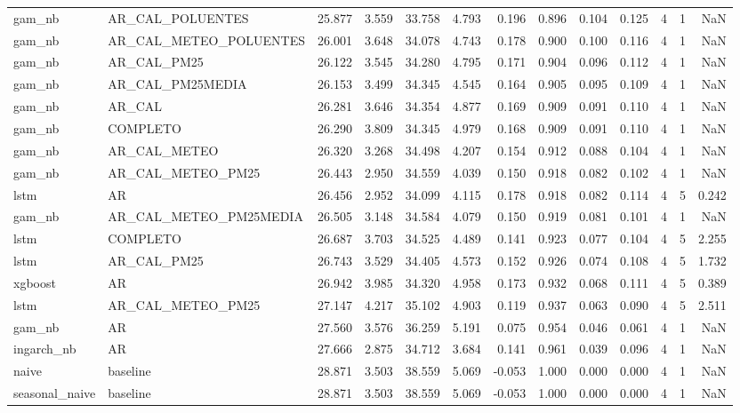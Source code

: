 \begin{tabular}{llrrrrrrrrrrr}
gam_nb & AR_CAL_POLUENTES & 25.877 & 3.559 & 33.758 & 4.793 & 0.196 & 0.896 & 0.104 & 0.125 & 4 & 1 & NaN \\
gam_nb & AR_CAL_METEO_POLUENTES & 26.001 & 3.648 & 34.078 & 4.743 & 0.178 & 0.900 & 0.100 & 0.116 & 4 & 1 & NaN \\
gam_nb & AR_CAL_PM25 & 26.122 & 3.545 & 34.280 & 4.795 & 0.171 & 0.904 & 0.096 & 0.112 & 4 & 1 & NaN \\
gam_nb & AR_CAL_PM25MEDIA & 26.153 & 3.499 & 34.345 & 4.545 & 0.164 & 0.905 & 0.095 & 0.109 & 4 & 1 & NaN \\
gam_nb & AR_CAL & 26.281 & 3.646 & 34.354 & 4.877 & 0.169 & 0.909 & 0.091 & 0.110 & 4 & 1 & NaN \\
gam_nb & COMPLETO & 26.290 & 3.809 & 34.345 & 4.979 & 0.168 & 0.909 & 0.091 & 0.110 & 4 & 1 & NaN \\
gam_nb & AR_CAL_METEO & 26.320 & 3.268 & 34.498 & 4.207 & 0.154 & 0.912 & 0.088 & 0.104 & 4 & 1 & NaN \\
gam_nb & AR_CAL_METEO_PM25 & 26.443 & 2.950 & 34.559 & 4.039 & 0.150 & 0.918 & 0.082 & 0.102 & 4 & 1 & NaN \\
lstm & AR & 26.456 & 2.952 & 34.099 & 4.115 & 0.178 & 0.918 & 0.082 & 0.114 & 4 & 5 & 0.242 \\
gam_nb & AR_CAL_METEO_PM25MEDIA & 26.505 & 3.148 & 34.584 & 4.079 & 0.150 & 0.919 & 0.081 & 0.101 & 4 & 1 & NaN \\
lstm & COMPLETO & 26.687 & 3.703 & 34.525 & 4.489 & 0.141 & 0.923 & 0.077 & 0.104 & 4 & 5 & 2.255 \\
lstm & AR_CAL_PM25 & 26.743 & 3.529 & 34.405 & 4.573 & 0.152 & 0.926 & 0.074 & 0.108 & 4 & 5 & 1.732 \\
xgboost & AR & 26.942 & 3.985 & 34.320 & 4.958 & 0.173 & 0.932 & 0.068 & 0.111 & 4 & 5 & 0.389 \\
lstm & AR_CAL_METEO_PM25 & 27.147 & 4.217 & 35.102 & 4.903 & 0.119 & 0.937 & 0.063 & 0.090 & 4 & 5 & 2.511 \\
gam_nb & AR & 27.560 & 3.576 & 36.259 & 5.191 & 0.075 & 0.954 & 0.046 & 0.061 & 4 & 1 & NaN \\
ingarch_nb & AR & 27.666 & 2.875 & 34.712 & 3.684 & 0.141 & 0.961 & 0.039 & 0.096 & 4 & 1 & NaN \\
naive & baseline & 28.871 & 3.503 & 38.559 & 5.069 & -0.053 & 1.000 & 0.000 & 0.000 & 4 & 1 & NaN \\
seasonal_naive & baseline & 28.871 & 3.503 & 38.559 & 5.069 & -0.053 & 1.000 & 0.000 & 0.000 & 4 & 1 & NaN \\
\bottomrule
\end{tabular}
